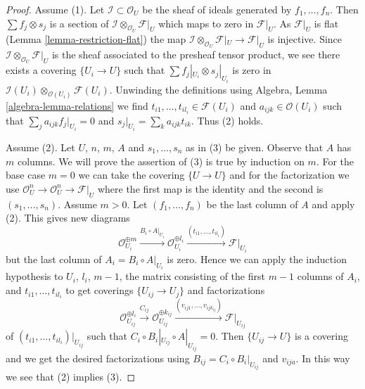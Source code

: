\begin{proof}
Assume (1). Let $\mathcal{I} \subset \mathcal{O}_U$ be the sheaf of ideals
generated by $f_1, \ldots, f_n$. Then $\sum f_j \otimes s_j$ is
a section of $\mathcal{I} \otimes_{\mathcal{O}_U} \mathcal{F}|_U$
which maps to zero in $\mathcal{F}|_U$. As $\mathcal{F}|_U$ is flat
(Lemma \ref{lemma-restriction-flat}) the map
$\mathcal{I} \otimes_{\mathcal{O}_U} \mathcal{F}|_U \to \mathcal{F}|_U$
is injective. Since $\mathcal{I} \otimes_{\mathcal{O}_U} \mathcal{F}|_U$
is the sheaf associated to the presheaf tensor product, we see
there exists a covering $\{U_i \to U\}$ such
that $\sum f_j|_{U_i} \otimes s_j|_{U_i}$ is zero in
$\mathcal{I}(U_i) \otimes_{\mathcal{O}(U_i)} \mathcal{F}(U_i)$.
Unwinding the definitions using Algebra, Lemma \ref{algebra-lemma-relations}
we find $t_{i1}, \ldots, t_{i l_i} \in \mathcal{F}(U_i)$ and
$a_{ijk} \in \mathcal{O}(U_i)$
such that $\sum_j a_{ijk}f_j|_{U_i} = 0$ and
$s_j|_{U_i} = \sum_k a_{ijk}t_{ik}$.
Thus (2) holds.

\medskip\noindent
Assume (2). Let $U$, $n$, $m$, $A$ and $s_1, \ldots, s_n$ as in (3) be given.
Observe that $A$ has $m$ columns. We will prove the assertion of (3)
is true by induction on $m$. For the base case $m = 0$ we
can take the covering $\{U \to U\}$ and for the factorization we use
$\mathcal{O}_U^n \to \mathcal{O}_U^n \to \mathcal{F}|_U$ where
the first map is the identity and the second is $(s_1, \ldots, s_n)$.
Assume $m > 0$. Let $(f_1, \ldots, f_n)$ be the last column of $A$
and apply (2). This gives new diagrams
$$
\mathcal{O}_{U_i}^{\oplus m} \xrightarrow{B_i \circ A|_{U_i}}
\mathcal{O}_{U_i}^{\oplus l_i} \xrightarrow{(t_{i1}, \ldots, t_{il_i})}
\mathcal{F}|_{U_i}
$$
but the last column of $A_i = B_i \circ A|_{U_i}$ is zero.
Hence we can apply the induction hypothesis to
$U_i$, $l_i$, $m - 1$, the matrix consisting of
the first $m - 1$ columns of $A_i$, and $t_{i1}, \ldots, t_{il_i}$
to get coverings $\{U_{ij} \to U_j\}$ and factorizations
$$
\mathcal{O}_{U_{ij}}^{\oplus l_i}
\xrightarrow{C_{ij}}
\mathcal{O}_{U_{ij}}^{\oplus k_{ij}}
\xrightarrow{(v_{ij1}, \ldots, v_{ij k_{ij}})}
\mathcal{F}|_{U_{ij}}
$$
of $(t_{i1}, \ldots, t_{il_i})|_{U_{ij}}$ such that
$C_i \circ B_i|_{U_{ij}} \circ A|_{U_{ij}} = 0$.
Then $\{U_{ij} \to U\}$ is a covering and we get the
desired factorizations
using $B_{ij} = C_i \circ B_i|_{U_{ij}}$ and
$v_{ija}$. In this way we see that (2) implies (3).


\end{proof}
